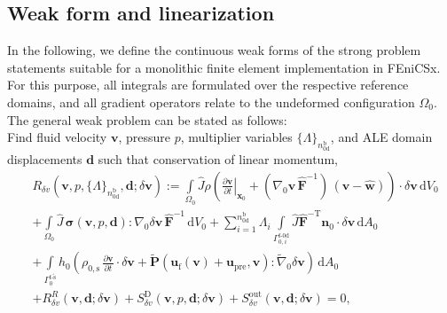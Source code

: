 \subsection*{Weak form and linearization}
In the following, we define the continuous weak forms of the strong problem statements suitable for a monolithic finite element implementation in FEniCSx. 
For this purpose, all integrals are formulated over the respective reference domains, and all gradient operators relate to the undeformed configuration $\mathit{\Omega}_{0}$. 
The general weak problem can be stated as follows:\\

Find fluid velocity $\boldsymbol{v}$, pressure $p$, multiplier variables $\{\mathit{\Lambda}\}_{n_{\mathrm{0d}}^{\mathrm{b}}}$, and ALE domain displacements $\boldsymbol{d}$ such that conservation of linear momentum,
\begin{equation}
\begin{aligned}
    &R_{\delta v}\left(\boldsymbol{v},p,\{\mathit{\Lambda}\}_{n_{\mathrm{0d}}^{\mathrm{b}}},\boldsymbol{d};\delta\boldsymbol{v}\right) := \int\limits_{\mathit{\Omega}_0} \widehat{J} \rho  \left(\left.\frac{\partial\boldsymbol{v}}{\partial t}\right|_{\boldsymbol{x}_{0}} + \left(\nabla_{0}\boldsymbol{v}\,\widehat{\boldsymbol{F}}^{-1}\right)\,\left(\boldsymbol{v}-\widehat{\boldsymbol{w}}\right)\right) \cdot \delta\boldsymbol{v} \,\mathrm{d}V_0 \\ &
    + \int\limits_{\mathit{\Omega}_0} \widehat{J}\,\boldsymbol{\sigma}(\boldsymbol{v},p,\boldsymbol{d}) : \nabla_{0} \delta\boldsymbol{v}\,\widehat{\boldsymbol{F}}^{-1} \,\mathrm{d}V_0 + \sum\limits_{i=1}^{n_{\mathrm{0d}}^{\mathrm{b}}} \mathit{\Lambda}_{i} \int\limits_{\mathit{\Gamma}_{0,i}^{\mathrm{f}\text{-}\mathrm{0d}}} \widehat{J}\widehat{\boldsymbol{F}}^{-\mathrm{T}}\boldsymbol{n}_{0}\cdot\delta\boldsymbol{v}\,\mathrm{d}A_0 \\
    &+ \int\limits_{\mathit{\Gamma}_{0}^{\mathrm{f}\text{-}\tilde{\mathrm{s}}}} h_0 \left(\rho_{0,\mathrm{s}}\,\frac{\partial\boldsymbol{v}}{\partial t} \cdot \delta\boldsymbol{v} + \tilde{\boldsymbol{P}}\left(\boldsymbol{u}_{\mathrm{f}}(\boldsymbol{v}) + \boldsymbol{u}_{\mathrm{pre}},\boldsymbol{v}\right) : \tilde{\nabla}_{0} \delta\boldsymbol{v}\right) \,\mathrm{d}A_0 \\
    &+ R_{\delta v}^{R}(\boldsymbol{v},\boldsymbol{d};\delta\boldsymbol{v}) + S_{\delta v}^{\mathrm{D}}(\boldsymbol{v},p,\boldsymbol{d};\delta\boldsymbol{v}) + S_{\delta v}^{\mathrm{out}}(\boldsymbol{v},\boldsymbol{d};\delta\boldsymbol{v}) = 0, \label{eq:frsi_weakform_v}
\end{aligned}
\end{equation}
